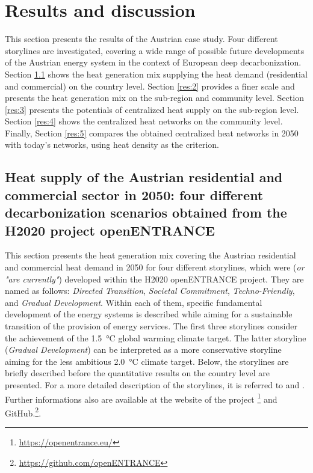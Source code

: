\section{Results and discussion}\label{results}
This section presents the results of the Austrian case study. Four different storylines are investigated, covering a wide range of possible future developments of the Austrian energy system in the context of European deep decarbonization. Section \ref{res:1} shows the heat generation mix supplying the heat demand (residential and commercial) on the country level. Section \ref{res:2} provides a finer scale and presents the heat generation mix on the sub-region and community level. Section \ref{res:3} presents the potentials of centralized heat supply on the sub-region level. Section \ref{res:4} shows the centralized heat networks on the community level. Finally, Section \ref{res:5} compares the obtained centralized heat networks in 2050 with today's networks, using heat density as the criterion.

\subsection{Heat supply of the Austrian residential and commercial sector in 2050: four different decarbonization scenarios obtained from the H2020 project openENTRANCE}\label{res:1}
This section presents the heat generation mix covering the Austrian residential and commercial heat demand in 2050 for four different storylines, which were (\textit{or "are currently"}) developed within the H2020 openENTRANCE project. They are named as follows: \textit{Directed Transition}, \textit{Societal Commitment}, \textit{Techno-Friendly}, and \textit{Gradual Development}. Within each of them, specific fundamental development of the energy systems is described while aiming for a sustainable transition of the provision of energy services. The first three storylines consider the achievement of the \SI{1.5}{\degreeCelsius} global warming climate target. The latter storyline (\textit{Gradual Development}) can be interpreted as a more conservative storyline aiming for the less ambitious \SI{2.0}{\degreeCelsius} climate target. Below, the storylines are briefly described before the quantitative results on the country level are presented. For a more detailed description of the storylines, it is referred to \cite{auer2020quantitative} and \cite{auer2020development}. Further informations also are available at the website of the project \footnote{\url{https://openentrance.eu/}} and GitHub.\footnote{\url{https://github.com/openENTRANCE}}.\newline


